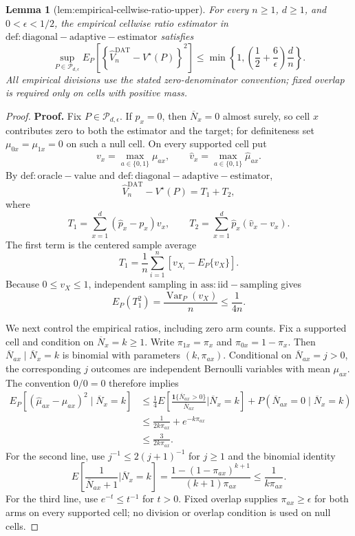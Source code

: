 \documentclass{article}
\newtheorem{lemma}{Lemma}
\begin{document}
\begin{lemma}[lem:empirical-cellwise-ratio-upper]\label{lem:empirical-cellwise-ratio-upper}
For every \(n\ge1\), \(d\ge1\), and \(0<\epsilon<1/2\), the empirical cellwise ratio estimator in \(\mathrm{def:diagonal-adaptive-estimator}\) satisfies
\[
 \sup_{P\in\mathcal P_{d,\epsilon}}
 E_P\!\left[
  \left\{\widehat V_n^{\mathrm{DAT}}-V^\star(P)\right\}^2
 \right]
 \le
 \min\!\left\{1,
  \left(\frac12+\frac6\epsilon\right)\frac dn
 \right\}.
\]
All empirical divisions use the stated zero-denominator convention; fixed overlap is required only on cells with positive mass.
\end{lemma}
\begin{proof}
\textbf{Proof.}
Fix \(P\in\mathcal P_{d,\epsilon}\).  If \(p_x=0\), then \(\overline N_x=0\) almost surely, so cell \(x\) contributes zero to both the estimator and the target; for definiteness set \(\mu_{0x}=\mu_{1x}=0\) on such a null cell.  On every supported cell put
\[
 v_x=\max_{a\in\{0,1\}}\mu_{ax},
 \qquad
 \widehat v_x=\max_{a\in\{0,1\}}\widehat\mu_{ax}.
\]
By \(\mathrm{def:oracle-value}\) and \(\mathrm{def:diagonal-adaptive-estimator}\),
\[
 \widehat V_n^{\mathrm{DAT}}-V^\star(P)=T_1+T_2,
\]
where
\[
 T_1=\sum_{x=1}^d(\widehat p_x-p_x)v_x,
 \qquad
 T_2=\sum_{x=1}^d\widehat p_x(\widehat v_x-v_x).
\]
The first term is the centered sample average
\[
 T_1=\frac1n\sum_{i=1}^n
 \left[v_{X_i}-E_P\{v_X\}\right].
\]
Because \(0\le v_X\le1\), independent sampling in \(\mathrm{ass:iid-sampling}\) gives
\[
 E_P(T_1^2)=\frac{\operatorname{Var}_P(v_X)}n\le\frac1{4n}.
\tag{1}
\]

We next control the empirical ratios, including zero arm counts.  Fix a supported cell and condition on \(\overline N_x=k\ge1\).  Write \(\pi_{1x}=\pi_x\) and \(\pi_{0x}=1-\pi_x\).  Then
\(\overline N_{ax}\mid\overline N_x=k\) is binomial with parameters \((k,\pi_{ax})\).  Conditional on \(\overline N_{ax}=j>0\), the corresponding \(j\) outcomes are independent Bernoulli variables with mean \(\mu_{ax}\).  The convention \(0/0=0\) therefore implies
\[
 \begin{aligned}
 E_P\!\left[
   (\widehat\mu_{ax}-\mu_{ax})^2
   \mid \overline N_x=k
 \right]
 &\le \frac14 E\!\left[
    \frac{\mathbf 1\{\overline N_{ax}>0\}}{\overline N_{ax}}
    \mathrel{\Big|}\overline N_x=k
  \right]
  +P(\overline N_{ax}=0\mid\overline N_x=k)\\
 &\le \frac1{2k\pi_{ax}}+e^{-k\pi_{ax}}\\
 &\le \frac3{2k\pi_{ax}}.
\tag{2}
 \end{aligned}
\]
For the second line, use \(j^{-1}\le2(j+1)^{-1}\) for \(j\ge1\) and the binomial identity
\[
 E\!\left[
   \frac1{\overline N_{ax}+1}
   \mathrel{\Big|}\overline N_x=k
 \right]
 =\frac{1-(1-\pi_{ax})^{k+1}}{(k+1)\pi_{ax}}
 \le\frac1{k\pi_{ax}}.
\]
For the third line, use \(e^{-t}\le t^{-1}\) for \(t>0\).  Fixed overlap supplies \(\pi_{ax}\ge\epsilon\) for both arms on every supported cell; no division or overlap condition is used on null cells.


\end{proof}
\end{document}
